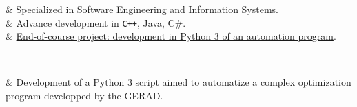 \begin{cvstate}
	\begin{cvtable}{2.5ex}
		{\tiny {}} & Specialized in Software Engineering and Information Systems.\\
		{\tiny {}} & Advance development in \verb!C++!, Java, C\#.\\
		{\tiny {}} & \href{https://github.com/vlnk/nomad-script}{End-of-course project: development in Python 3 of an automation program}.\\
	\end{cvtable}

	\\
	\begin{cvtable}{2.5ex}
			{\tiny {}} & Development of a Python 3 script aimed to automatize a complex optimization program developped by the \textsc{GERAD}.
	\end{cvtable}
\end{cvstate}


\vspace{0.2cm}
